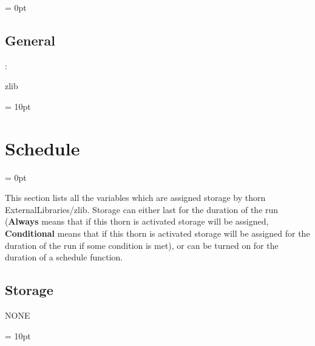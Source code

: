 \parskip = 0pt

\vspace{3mm} \subsection*{General}

: 

zlib
\vspace{2mm}

\vspace{5mm}\parskip = 10pt 

\section{Schedule} 


\parskip = 0pt


\noindent This section lists all the variables which are assigned storage by thorn ExternalLibraries/zlib.  Storage can either last for the duration of the run ({\bf Always} means that if this thorn is activated storage will be assigned, {\bf Conditional} means that if this thorn is activated storage will be assigned for the duration of the run if some condition is met), or can be turned on for the duration of a schedule function.


\subsection*{Storage}NONE

\vspace{5mm}\parskip = 10pt 

